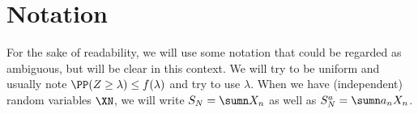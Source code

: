 \section*{Notation}

For the sake of readability, we will use some notation that could be regarded as ambiguous, but will be clear in this context. We will try to be uniform and usually note $\PP(Z\geq \lambda) \leq f(\lambda)$ and try to use $\lambda$. When we have (independent) random variables $\XN$, we will write $S_N=\sumn X_n$ as well as $S_N^a=\sumn a_nX_n$.

